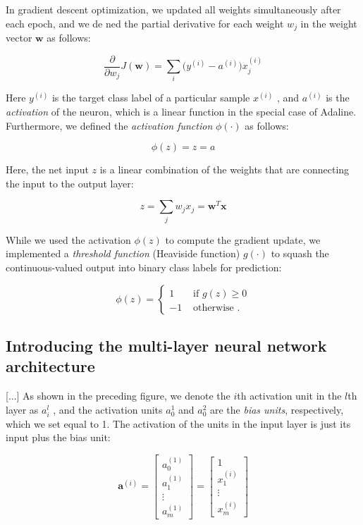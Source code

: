 \documentclass[letterpaper]{report}
\begin{document}
In gradient descent optimization, we updated all weights simultaneously after each epoch, and we de ned the partial derivative for each weight $w_j$ in the weight vector
$\mathbf{w}$ as follows:

\[
\frac{\partial}{\partial w_j} J(\mathbf{w}) = \sum_i \big( y^{(i)} - a^{(i)} \big) x_{j}^{(i)}
\]

Here $y^{(i)}$ is the target class label of a particular sample $x^{(i)}$ , and $a^{(i)}$ is the \textit{activation} of the neuron, which is a linear function in the special case of Adaline. Furthermore, we defined the \textit{activation function} $\phi(\cdot)$ as follows:

\[
\phi(z) = z = a
\]

Here, the net input $z$  is a linear combination of the weights that are connecting the
input to the output layer:

\[
z = \sum_j w_j x_j = \mathbf{w}^T \mathbf{x}
\]

While we used the activation $\phi(z)$ to compute the gradient update, we implemented a \textit{threshold function} (Heaviside function) $g(\cdot)$ to squash the continuous-valued output into binary class labels for prediction:

\[ \phi(z) = \begin{cases} 
      1 & \text{ if } g(z) \ge 0 \\
      -1 & \text{ otherwise }.
   \end{cases}
\]

\subsection{Introducing the multi-layer neural network architecture}

[...] As shown in the preceding figure, we denote the $i$th activation unit in the $l$th layer as $a_{i}^{l}$ , and the activation units $a_{0}^{1}$ and $a_{0}^{2}$ are the \textit{bias units}, respectively, which we set equal to 1. The activation of the units in the input layer is just its input plus the bias unit:

\[
\mathbf{a}^{(i)} = 
\begin{bmatrix}
 a_{0}^{(1)} \\
 a_{1}^{(1)} \\
 \vdots \\
 a_{m}^{(1)}
\end{bmatrix}
= 
\begin{bmatrix}
 1 \\
 x_{1}^{(i)} \\
 \vdots \\
 x_{m}^{(i)}
\end{bmatrix}
\]
\end{document}
